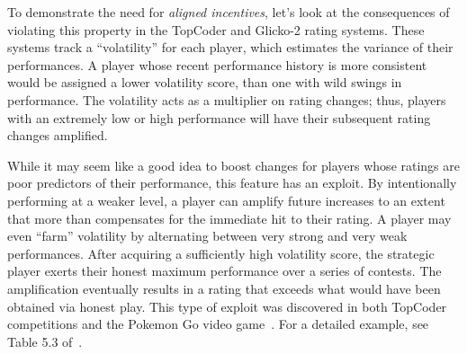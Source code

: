 

To demonstrate the need for \emph{aligned incentives}, let's look at the consequences of violating this property in the TopCoder and Glicko-2 rating systems. These systems track a ``volatility'' for each player, which estimates the variance of their performances. A player whose recent performance history is more consistent would be assigned a lower volatility score, than one with wild swings in performance. The volatility acts as a multiplier on rating changes; thus, players with an extremely low or high performance will have their subsequent rating changes amplified.

While it may seem like a good idea to boost changes for players whose ratings are poor predictors of their performance, this feature has an exploit. By intentionally performing at a weaker level, a player can amplify future increases to an extent that more than compensates for the immediate hit to their rating. A player may even ``farm'' volatility by alternating between very strong and very weak performances. After acquiring a sufficiently high volatility score, the strategic player exerts their honest maximum performance over a series of contests. The amplification eventually results in a rating that exceeds what would have been obtained via honest play. This type of exploit was discovered in both TopCoder competitions and the Pokemon Go video game~\cite{forivsektheoretical, pokemongo}. For a detailed example, see Table 5.3 of~\cite{forivsektheoretical}.

